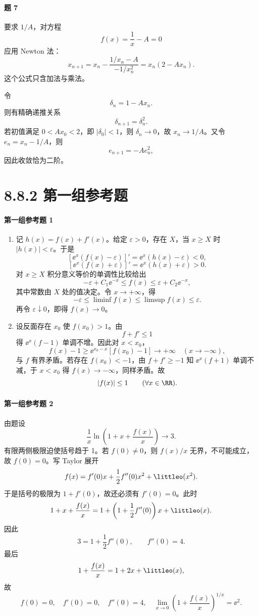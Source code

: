 \paragraph{题 7}
\begin{xsolution}
要求 $1/A$，对方程
\[
  f(x)=\frac1x-A=0
\]
应用 Newton 法：
\[
  x_{n+1}
  =x_n-\frac{1/x_n-A}{-1/x_n^2}
  =\boxed{x_n(2-Ax_n)}.
\]
这个公式只含加法与乘法。

令
\[
  \delta_n=1-Ax_n.
\]
则有精确递推关系
\[
  \delta_{n+1}=\delta_n^2.
\]
若初值满足 $0<Ax_0<2$，即 $|\delta_0|<1$，则 $\delta_n\to0$，故 $x_n\to1/A$。又令 $e_n=x_n-1/A$，则
\[
  e_{n+1}=-A e_n^2,
\]
因此收敛恰为二阶。
\end{xsolution}

\section*{8.8.2 第一组参考题}

\paragraph{第一组参考题 1}
\begin{xsolution}
\begin{enumerate}[label=(\arabic*)]
  \item 记 $h(x)=f(x)+f'(x)$。给定 $\varepsilon>0$，存在 $X$，当 $x\ge X$ 时 $|h(x)|<\varepsilon$。于是
  \[
    [\ee^x(f(x)-\varepsilon)]'
    =\ee^x(h(x)-\varepsilon)<0,
  \]
  \[
    [\ee^x(f(x)+\varepsilon)]'
    =\ee^x(h(x)+\varepsilon)>0.
  \]
  对 $x\ge X$ 积分意义等价的单调性比较给出
  \[
    -\varepsilon+C_1\ee^{-x}\le f(x)
    \le\varepsilon+C_2\ee^{-x},
  \]
  其中常数由 $X$ 处的值决定。令 $x\to+\infty$，得
  \[
    -\varepsilon\le\liminf f(x)\le\limsup f(x)\le\varepsilon.
  \]
  再令 $\varepsilon\downarrow0$，即得 $f(x)\to0$。

  \item 设反面存在 $x_0$ 使 $f(x_0)>1$。由
  \[
    f+f'\le1
  \]
  得 $\ee^x(f-1)$ 单调不增。因此对 $x<x_0$，
  \[
    f(x)-1\ge\ee^{x_0-x}[f(x_0)-1]\to+\infty
    \quad(x\to-\infty),
  \]
  与 $f$ 有界矛盾。若存在 $f(x_0)<-1$，由 $f+f'\ge-1$ 知 $\ee^x(f+1)$ 单调不减，于 $x<x_0$ 得 $f(x)\to-\infty$，同样矛盾。故
  \[
    |f(x)|\le1\qquad(\forall x\in\RR).
  \]
\end{enumerate}
\end{xsolution}

\paragraph{第一组参考题 2}
\begin{xsolution}
由题设
\[
  \frac1x\ln\left(1+x+\frac{f(x)}x\right)\to3.
\]
有限两侧极限迫使括号趋于 1。若 $f(0)\ne0$，则 $f(x)/x$ 无界，不可能成立，故 $f(0)=0$。写 Taylor 展开
\[
  f(x)=f'(0)x+\frac12f''(0)x^2+\littleo(x^2).
\]
于是括号的极限为 $1+f'(0)$，故还必须有 $f'(0)=0$。此时
\[
  1+x+\frac{f(x)}x
  =1+\left(1+\frac12f''(0)\right)x+\littleo(x).
\]
因此
\[
  3=1+\frac12f''(0),
  \qquad f''(0)=4.
\]
最后
\[
  1+\frac{f(x)}x=1+2x+\littleo(x),
\]
故
\[
  \boxed{f(0)=0,\quad f'(0)=0,\quad f''(0)=4,\quad
  \lim_{x\to0}\left(1+\frac{f(x)}x\right)^{1/x}=\ee^2}.
\]
\end{xsolution}

